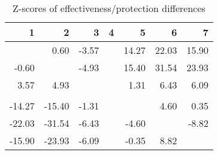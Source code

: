 \begin{table}[ht]
\centering
\begin{tabular}{rrrrrrr}
  \hline
1 & 2 & 3 & 4 & 5 & 6 & 7 \\ 
  \hline
 & 0.60 & -3.57 &  & 14.27 & 22.03 & 15.90 \\ 
  -0.60 &  & -4.93 &  & 15.40 & 31.54 & 23.93 \\ 
  3.57 & 4.93 &  &  & 1.31 & 6.43 & 6.09 \\ 
   &  &  &  &  &  &  \\ 
  -14.27 & -15.40 & -1.31 &  &  & 4.60 & 0.35 \\ 
  -22.03 & -31.54 & -6.43 &  & -4.60 &  & -8.82 \\ 
  -15.90 & -23.93 & -6.09 &  & -0.35 & 8.82 &  \\ 
   \hline
\end{tabular}
\caption{Z-scores of effectiveness/protection differences} 
\end{table}
